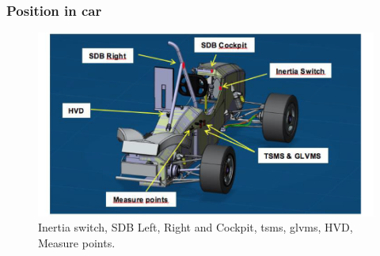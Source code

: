 \subsubsection{Position in car}

\begin{figure}[H]
	\includegraphics[width=\textwidth]{./img/SDC-positionInCar.png}
	\caption{Inertia switch, SDB Left, Right and Cockpit, \gls{tsms}, \gls{glvms}, HVD, Measure points.}
	\label{fig:SDC-positionInCar}
\end{figure}
